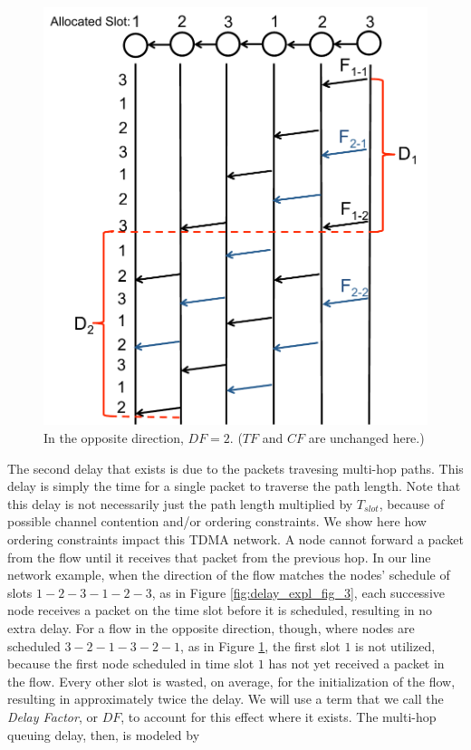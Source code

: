 \begin{figure}
\begin{centering}
    \includegraphics[scale=0.35]{figures/delay_limit_expl/fig_2_2.pdf}
    \caption{In the opposite direction, $DF = 2$. ($TF$ and $CF$ are unchanged here.)}
    \label{fig:delay_expl_fig_4}
\end{centering}
\end{figure}

The second delay that exists is due to the packets travesing multi-hop paths. This delay is simply the time for a single packet to traverse the path length. Note that this delay is not necessarily just the path length multiplied by $T_{slot}$, because of possible channel contention and/or ordering constraints. We show here how ordering constraints impact this TDMA network. A node cannot forward a packet from the flow until it receives that packet from the previous hop. In our line network example, when the direction of the flow matches the nodes' schedule of slots $1-2-3-1-2-3$, as in Figure \ref{fig:delay_expl_fig_3}, each successive node receives a packet on the time slot before it is scheduled, resulting in no extra delay. For a flow in the opposite direction, though, where nodes are scheduled $3-2-1-3-2-1$, as in Figure \ref{fig:delay_expl_fig_4}, the first slot $1$ is not utilized, because the first node scheduled in time slot $1$ has not yet received a packet in the flow. Every other slot is wasted, on average, for the initialization of the flow, resulting in approximately twice the delay. We will use a term that we call the \emph{Delay Factor}, or $DF$, to account for this effect where it exists. 
The multi-hop queuing delay, then, is modeled by

